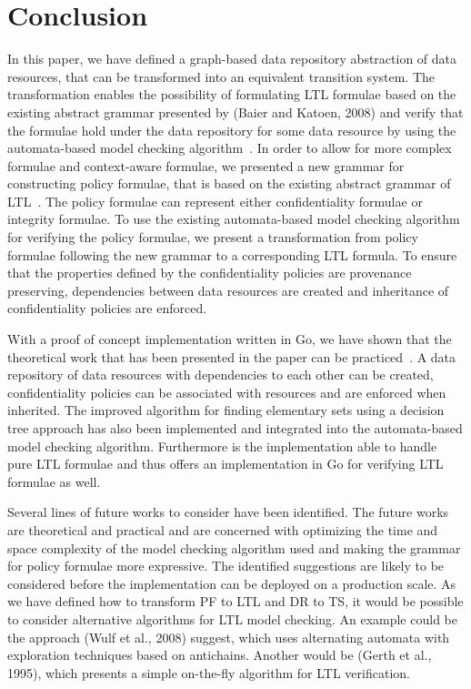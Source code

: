 \section{Conclusion}
In this paper, we have defined a graph-based data repository abstraction of data resources, that can be transformed into an equivalent transition system. The transformation enables the possibility of formulating LTL formulae based on the existing abstract grammar presented by (Baier and Katoen, 2008)\cite{baier2008principles} and verify that the formulae hold under the data repository for some data resource by using the automata-based model checking algorithm~\cite{baier2008principles}. In order to allow for more complex formulae and context-aware formulae, we presented a new grammar for constructing policy formulae, that is based on the existing abstract grammar of LTL~\cite{baier2008principles}. The policy formulae can represent either confidentiality formulae or integrity formulae. To use the existing automata-based model checking algorithm for verifying the policy formulae, we present a transformation from policy formulae following the new grammar to a corresponding LTL formula. To ensure that the properties defined by the confidentiality policies are provenance preserving, dependencies between data resources are created and inheritance of confidentiality policies are enforced.

With a proof of concept implementation written in Go, we have shown that the theoretical work that has been presented in the paper can be practiced~\cite{tympanix}. A data repository of data resources with dependencies to each other can be created, confidentiality policies can be associated with resources and are enforced when inherited. The improved algorithm for finding elementary sets using a decision tree approach has also been implemented and integrated into the automata-based model checking algorithm. Furthermore is the implementation able to handle pure LTL formulae and thus offers an implementation in Go for verifying LTL formulae as well.

Several lines of future works to consider have been identified. The future works are theoretical and practical and are concerned with optimizing the time and space complexity of the model checking algorithm used and making the grammar for policy formulae more expressive. The identified suggestions are likely to be considered before the implementation can be deployed on a production scale. As we have defined how to transform PF to LTL and DR to TS, it would be possible to consider alternative algorithms for LTL model checking. An example could be the approach (Wulf et al., 2008)\cite{de2008antichains} suggest, which uses alternating automata with exploration techniques based on antichains. Another would be (Gerth et al., 1995)\cite{gerth1995simple}, which presents a simple on-the-fly algorithm for LTL verification.
